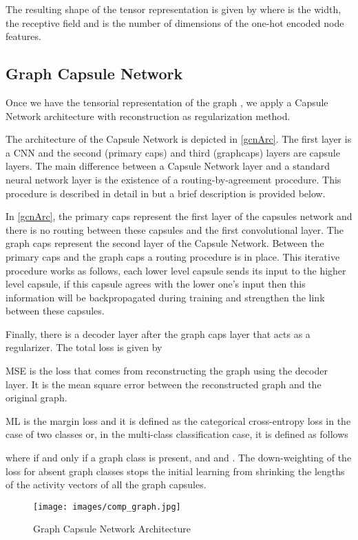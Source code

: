 \documentclass[conference]{IEEEtran}
\begin{document}
The resulting shape of the tensor representation  is given by   where  is the width,  the receptive field and  is the number of dimensions of the one-hot encoded node features.


\subsection{Graph Capsule Network}
Once we have the tensorial representation of the graph , we apply a Capsule Network architecture with reconstruction as regularization method. 

The architecture of the Capsule Network is depicted in \autoref{gcnArc}. The first layer is a CNN and the second (primary caps) and third (graphcaps) layers are capsule layers.
The main difference between a Capsule Network layer and a standard neural network layer is the existence of a routing-by-agreement procedure. This procedure is described in detail in \cite{sabour2017dynamic} but a brief description is provided below.

In \autoref{gcnArc}, the primary caps represent the first layer of the capsules network and there is no routing between these capsules and the first convolutional layer. The graph caps represent the second layer of the Capsule Network.
Between the primary caps and the graph caps a routing procedure is in place. This iterative procedure works as follows, each lower level capsule sends its input to the higher level capsule, if this capsule agrees with the lower one's input then this information will be backpropagated during training and strengthen the link between these capsules.

Finally, there is a decoder layer after the graph caps layer that acts as a regularizer. The total loss is given by 

MSE is the loss that comes from reconstructing the graph using the decoder layer. It is the mean square error between the reconstructed graph and the original graph.

ML is the margin loss and it is defined as the categorical cross-entropy loss in the case of two classes or, in the multi-class classification case, it is defined as follows

where  if and only if a graph class  is present, and  and . The  down-weighting of the loss for absent graph classes stops the initial learning from shrinking the lengths of the activity vectors of all the graph capsules.

\begin{figure}[ht]
\vskip 0.2in
\begin{center}
\centerline{\texttt{[image: images/comp\_graph.jpg]}}
\caption{Graph Capsule Network Architecture}
\label{gcnArc}
\end{center}
\vskip -0.2in
\end{figure}
\end{document}
